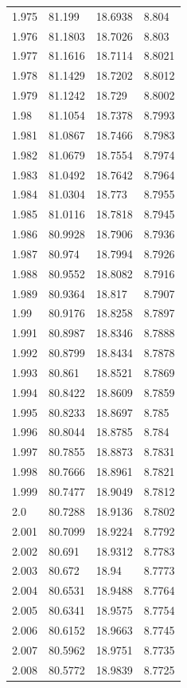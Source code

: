 \begin{tabular}{llll}
1.975 & 81.199 & 18.6938 & 8.804 \\
1.976 & 81.1803 & 18.7026 & 8.803 \\
1.977 & 81.1616 & 18.7114 & 8.8021 \\
1.978 & 81.1429 & 18.7202 & 8.8012 \\
1.979 & 81.1242 & 18.729 & 8.8002 \\
1.98 & 81.1054 & 18.7378 & 8.7993 \\
1.981 & 81.0867 & 18.7466 & 8.7983 \\
1.982 & 81.0679 & 18.7554 & 8.7974 \\
1.983 & 81.0492 & 18.7642 & 8.7964 \\
1.984 & 81.0304 & 18.773 & 8.7955 \\
1.985 & 81.0116 & 18.7818 & 8.7945 \\
1.986 & 80.9928 & 18.7906 & 8.7936 \\
1.987 & 80.974 & 18.7994 & 8.7926 \\
1.988 & 80.9552 & 18.8082 & 8.7916 \\
1.989 & 80.9364 & 18.817 & 8.7907 \\
1.99 & 80.9176 & 18.8258 & 8.7897 \\
1.991 & 80.8987 & 18.8346 & 8.7888 \\
1.992 & 80.8799 & 18.8434 & 8.7878 \\
1.993 & 80.861 & 18.8521 & 8.7869 \\
1.994 & 80.8422 & 18.8609 & 8.7859 \\
1.995 & 80.8233 & 18.8697 & 8.785 \\
1.996 & 80.8044 & 18.8785 & 8.784 \\
1.997 & 80.7855 & 18.8873 & 8.7831 \\
1.998 & 80.7666 & 18.8961 & 8.7821 \\
1.999 & 80.7477 & 18.9049 & 8.7812 \\
2.0 & 80.7288 & 18.9136 & 8.7802 \\
2.001 & 80.7099 & 18.9224 & 8.7792 \\
2.002 & 80.691 & 18.9312 & 8.7783 \\
2.003 & 80.672 & 18.94 & 8.7773 \\
2.004 & 80.6531 & 18.9488 & 8.7764 \\
2.005 & 80.6341 & 18.9575 & 8.7754 \\
2.006 & 80.6152 & 18.9663 & 8.7745 \\
2.007 & 80.5962 & 18.9751 & 8.7735 \\
2.008 & 80.5772 & 18.9839 & 8.7725 \\

\end{tabular}
